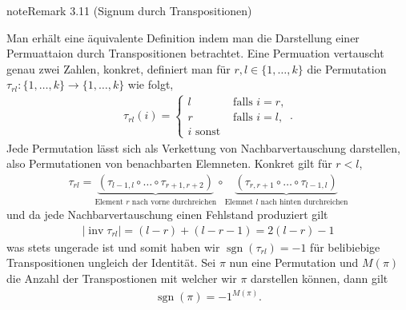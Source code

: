 \documentclass[letterpaper,10pt,english]{jupyterBook}
\begin{document}
\begin{sphinxadmonition}{note}{Remark 3.11 (Signum durch Transpositionen)}



\sphinxAtStartPar
Man erhält eine äquivalente Definition indem man die Darstellung einer Permuattaion durch Transpositionen betrachtet. Eine Permuation vertauscht genau zwei Zahlen, konkret, definiert man für \(r,l\in\{1,\ldots,k\}\) die Permutation \(\tau_{rl}:\{1,\ldots,k\}\to\{1,\ldots,k\}\) wie folgt,
\begin{equation*}
\begin{split}\tau_{rl}(i) = 
\begin{cases}
l&\text{ falls } i=r,\\
r&\text{ falls } i=l,\\
i\text{ sonst}
\end{cases}.\end{split}
\end{equation*}
\sphinxAtStartPar
Jede Permutation lässt sich als Verkettung von Nachbarvertauschung darstellen, also Permutationen von benachbarten Elemneten. Konkret gilt für \(r<l\),
\begin{equation*}
\begin{split}\tau_{rl} = \underbrace{\left(\tau_{l-1,l}\circ\ldots\circ \tau_{r+1,r+2} \right)}_{\text{Element }r\text{ nach vorne durchreichen}}\circ
\underbrace{\left(\tau_{r,r+1}\circ\ldots\circ \tau_{l-1,l} \right)}_{\text{Elemnet }l\text{ nach hinten durchreichen}}\end{split}
\end{equation*}
\sphinxAtStartPar
und da jede Nachbarvertauschung einen Fehlstand produziert gilt
\begin{equation*}
\begin{split}|\operatorname{inv}\tau_{rl}| = (l-r) + (l-r-1) = 2(l-r)-1\end{split}
\end{equation*}
\sphinxAtStartPar
was stets ungerade ist und somit haben wir \(\operatorname{sgn}(\tau_{rl}) = -1\) für belibiebige Transpositionen ungleich der Identität.
Sei \(\pi\) nun eine Permutation und \(M(\pi)\) die Anzahl der Transpostionen mit welcher wir \(\pi\) darstellen können, dann gilt
\begin{equation*}
\begin{split}\operatorname{sgn}(\pi) = -1^{M(\pi)}.\end{split}
\end{equation*}\end{sphinxadmonition}
\end{document}
